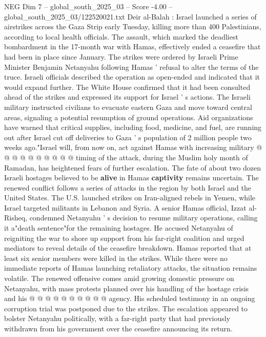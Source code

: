 \begin{textsample}{NEG Dim 7 – global\_south\_2025\_03 – Score -4.00 – global\_south\_2025\_03/122520021.txt}  \label{ex:f7_neg_360}
Deir al-Balah : Israel launched a series of airstrikes across the Gaza Strip early Tuesday, killing more than 400 Palestinians, according to local health officials.
The assault, which marked the deadliest bombardment in the 17-month war with Hamas, effectively ended a ceasefire that had been in place since January.
The strikes were ordered by Israeli Prime Minister Benjamin Netanyahu following Hamas ' refusal to alter the terms of the truce.
Israeli officials described the operation as open-ended and indicated that it would expand further.
The White House confirmed that it had been consulted ahead of the strikes and expressed its support for Israel ' s actions.
The Israeli military instructed civilians to evacuate eastern Gaza and move toward central areas, signaling a potential resumption of ground operations.
Aid organizations have warned that critical supplies, including food, medicine, and fuel, are running out after Israel cut off deliveries to Gaza ' s population of 2 million people two weeks ago."Israel will, from now on, act against Hamas with increasing military @ @ @ @ @ @ @ @ @ @ timing of the attack, during the Muslim holy month of Ramadan, has heightened fears of further escalation.
The fate of about two dozen Israeli hostages believed to be \textbf{alive} in Hamas \textbf{captivity} remains uncertain.
The renewed conflict follows a series of attacks in the region by both Israel and the United States.
The U.S. launched strikes on Iran-aligned rebels in Yemen, while Israel targeted militants in Lebanon and Syria.
A senior Hamas official, Izzat al-Risheq, condemned Netanyahu ' s decision to resume military operations, calling it a"death sentence"for the remaining hostages.
He accused Netanyahu of reigniting the war to shore up support from his far-right coalition and urged mediators to reveal details of the ceasefire breakdown.
Hamas reported that at least six senior members were killed in the strikes.
While there were no immediate reports of Hamas launching retaliatory attacks, the situation remains volatile.
The renewed offensive comes amid growing domestic pressure on Netanyahu, with mass protests planned over his handling of the hostage crisis and his @ @ @ @ @ @ @ @ @ @ agency.
His scheduled testimony in an ongoing corruption trial was postponed due to the strikes.
The escalation appeared to bolster Netanyahu politically, with a far-right party that had previously withdrawn from his government over the ceasefire announcing its return.

\end{textsample}
